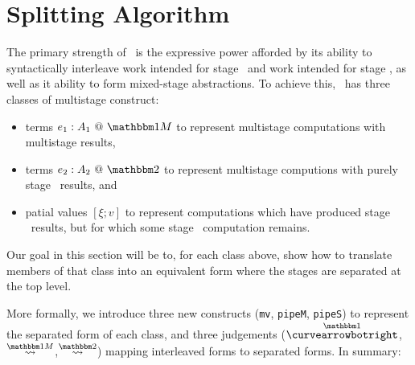 
\section{Splitting Algorithm}
\label{sec:splitting}

\begin{abstrsyn}

The primary strength of \lang\ is the expressive power afforded by
its ability to syntactically interleave work intended for stage \bbone\
and work intended for stage \bbtwo, as well as it ability to form
mixed-stage abstractions.
To achieve this, \lang\ has three classes of multistage construct:
\begin{itemize}
\item terms $\colmix {e_1}{A_1}$ to represent multistage computations with multistage results,
\item terms $\coltwo {e_2}{A_2}$ to represent multistage computions with purely stage \bbtwo\ results, and
\item patial values $[\xi; v]$ to represent computations which have produced stage \bbone\ results,
but for which some stage \bbtwo\ computation remains.
\end{itemize}

Our goal in this section will be to, for each class above, 
show how to translate members of that class into
an equivalent form where the stages are separated at the top level.

More formally, we introduce three new constructs 
(\texttt{mv}, \texttt{pipeM}, \texttt{pipeS}) 
to represent the separated form of each class, 
and three judgements ($\vsplito$,$\splitonesym$,$\splittwosym$)
mapping interleaved forms to separated forms.
In summary:


\end{abstrsyn}
